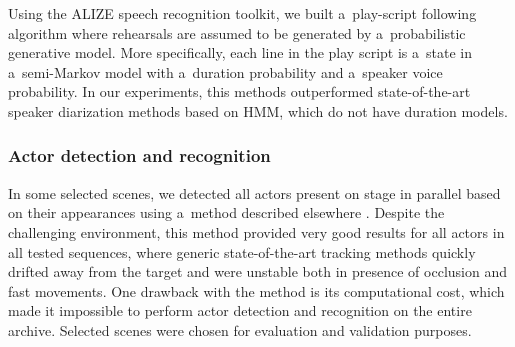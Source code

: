 \documentclass[conference]{IEEEtran}
\begin{document}
Using the ALIZE speech recognition toolkit, we built a~play-script following algorithm where rehearsals are assumed to be generated by a~probabilistic generative model.  More specifically, each  line in the play script is a~state in a~semi-Markov model with a~duration probability and a~speaker voice probability. In our experiments, this methods outperformed state-of-the-art speaker diarization methods based on HMM, which do not have duration models. %
 



\subsubsection{Actor detection and recognition} 

In some selected scenes, we  detected all actors present on stage in parallel based on their appearances
using a~method described elsewhere \cite{Gandhi13}. Despite the challenging environment, this method provided very good results for  all actors in all tested sequences, where generic state-of-the-art tracking methods quickly drifted away from the target and were unstable both in presence of occlusion and fast movements. One drawback with the method is its computational cost, which made it impossible to perform
actor detection and recognition on the entire archive. Selected scenes were chosen for evaluation and validation purposes.

\end{document}
